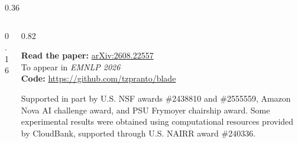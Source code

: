 \begin{columns}[T]
\begin{column}{0.36\linewidth}
          \begin{plainblock}{}
            \begin{columns}[c]
              \begin{column}{0.16\linewidth}
              \end{column}
              \begin{column}{0.82\linewidth}
                \raggedright
                {\large\bfseries\color{psu-beaver}Read the paper:} \href{https://arxiv.org/abs/2608.22557}{arXiv:2608.22557}\\[0.3ex]
                {\small To appear in \emph{EMNLP 2026}}\\
                {\small\textbf{Code:} \url{https://github.com/tzpranto/blade}}\\[0.5ex]
                {\tiny Supported in part by U.S. NSF awards \#2438810 and \#2555559, Amazon Nova AI challenge award, and PSU Frymoyer chairship award. Some experimental results were obtained using computational resources provided by CloudBank, supported through U.S. NAIRR award \#240336.\par}
              \end{column}
            \end{columns}
          \end{plainblock}
        \end{column}
      \end{columns}

